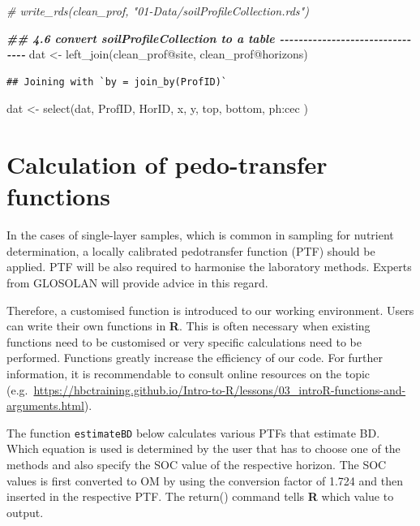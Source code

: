 \documentclass[
  10pt,
  b5paper,
  oneside]{book}
\newenvironment{Shaded}{\begin{snugshade}}{\end{snugshade}}
\newcommand{\CommentTok}[1]{\textcolor[rgb]{0.56,0.35,0.01}{\textit{#1}}}
\newcommand{\DocumentationTok}[1]{\textcolor[rgb]{0.56,0.35,0.01}{\textbf{\textit{#1}}}}
\newcommand{\FunctionTok}[1]{\textcolor[rgb]{0.00,0.00,0.00}{#1}}
\newcommand{\NormalTok}[1]{#1}
\newcommand{\OtherTok}[1]{\textcolor[rgb]{0.56,0.35,0.01}{#1}}
\newcommand{\SpecialCharTok}[1]{\textcolor[rgb]{0.00,0.00,0.00}{#1}}
\begin{document}
\begin{Shaded}
\begin{Highlighting}[]
\CommentTok{\# write\_rds(clean\_prof, "01{-}Data/soilProfileCollection.rds")}

\DocumentationTok{\#\# 4.6 convert soilProfileCollection to a table {-}{-}{-}{-}{-}{-}{-}{-}{-}{-}{-}{-}{-}{-}{-}{-}{-}{-}{-}{-}{-}{-}{-}{-}{-}{-}{-}{-}{-}{-}{-}{-}}
\NormalTok{dat }\OtherTok{\textless{}{-}} \FunctionTok{left\_join}\NormalTok{(clean\_prof}\SpecialCharTok{@}\NormalTok{site, clean\_prof}\SpecialCharTok{@}\NormalTok{horizons)}
\end{Highlighting}
\end{Shaded}

\begin{verbatim}
## Joining with `by = join_by(ProfID)`
\end{verbatim}

\begin{Shaded}
\begin{Highlighting}[]
\NormalTok{dat }\OtherTok{\textless{}{-}} \FunctionTok{select}\NormalTok{(dat, ProfID, HorID, x, y, top, bottom, ph}\SpecialCharTok{:}\NormalTok{cec )}
\end{Highlighting}
\end{Shaded}

\hypertarget{calculation-of-pedo-transfer-functions}{%
\section{Calculation of pedo-transfer functions}\label{calculation-of-pedo-transfer-functions}}

In the cases of single-layer samples, which is common in sampling for nutrient determination, a locally calibrated pedotransfer function (PTF) should be applied. PTF will be also required to harmonise the laboratory methods. Experts from GLOSOLAN will provide advice in this regard.

Therefore, a customised function is introduced to our working environment. Users can write their own functions in \textbf{R}. This is often necessary when existing functions need to be customised or very specific calculations need to be performed. Functions greatly increase the efficiency of our code. For further information, it is recommendable to consult online resources on the topic (e.g.~\url{https://hbctraining.github.io/Intro-to-R/lessons/03_introR-functions-and-arguments.html}).

The function \texttt{estimateBD} below calculates various PTFs that estimate BD. Which equation is used is determined by the user that has to choose one of the methods and also specify the SOC value of the respective horizon. The SOC values is first converted to OM by using the conversion factor of 1.724 and then inserted in the respective PTF. The return() command tells \textbf{R} which value to output.
\end{document}

